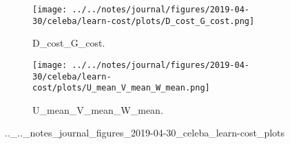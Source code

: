 \begin{figure}[!htbp]
   \centering
\begin{subfigure}[t]{0.48\textwidth}
   \texttt{[image: ../../notes/journal/figures/2019-04-30/celeba/learn-cost/plots/D\_cost\_G\_cost.png]}
   \caption{D_cost_G_cost.}
   \label{fig:.._.._notes_journal_figures_2019-04-30_celeba_learn-cost_plots-a}
\end{subfigure}
\begin{subfigure}[t]{0.48\textwidth}
   \texttt{[image: ../../notes/journal/figures/2019-04-30/celeba/learn-cost/plots/U\_mean\_V\_mean\_W\_mean.png]}
   \caption{U_mean_V_mean_W_mean.}
   \label{fig:.._.._notes_journal_figures_2019-04-30_celeba_learn-cost_plots-b}
\end{subfigure}
   \caption{.._.._notes_journal_figures_2019-04-30_celeba_learn-cost_plots}
   \label{fig:.._.._notes_journal_figures_2019-04-30_celeba_learn-cost_plots}
\end{figure}